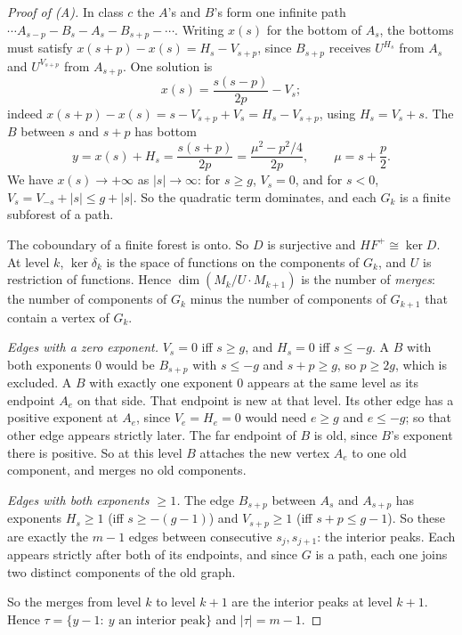 \documentclass[11pt]{article}
\theoremstyle{definition}
\newcommand{\HFp}{\mathit{HF}^+}
\begin{document}
\begin{proof}[Proof of (A)]
In class $c$ the $A$'s and $B$'s form one infinite path $\cdots A_{s-p}-B_s-A_s-B_{s+p}-\cdots$. Writing $x(s)$ for the bottom of $A_s$, the bottoms must satisfy $x(s+p)-x(s)=H_s-V_{s+p}$, since $B_{s+p}$ receives $U^{H_s}$ from $A_s$ and $U^{V_{s+p}}$ from $A_{s+p}$. One solution is
\[
x(s)=\frac{s(s-p)}{2p}-V_s;
\]
indeed $x(s+p)-x(s)=s-V_{s+p}+V_s=H_s-V_{s+p}$, using $H_s=V_s+s$. The $B$ between $s$ and $s+p$ has bottom
\[
y=x(s)+H_s=\frac{s(s+p)}{2p}=\frac{\mu^2-p^2/4}{2p},\qquad \mu=s+\frac p2.
\]
We have $x(s)\to+\infty$ as $|s|\to\infty$: for $s\ge g$, $V_s=0$, and for $s<0$, $V_s=V_{-s}+|s|\le g+|s|$. So the quadratic term dominates, and each $G_k$ is a finite subforest of a path.

The coboundary of a finite forest is onto. So $D$ is surjective and $\HFp\cong\ker D$. At level $k$, $\ker\delta_k$ is the space of functions on the components of $G_k$, and $U$ is restriction of functions. Hence $\dim(M_k/U\cdot M_{k+1})$ is the number of \emph{merges}: the number of components of $G_k$ minus the number of components of $G_{k+1}$ that contain a vertex of $G_k$.

\emph{Edges with a zero exponent.} $V_s=0$ iff $s\ge g$, and $H_s=0$ iff $s\le -g$. A $B$ with both exponents $0$ would be $B_{s+p}$ with $s\le-g$ and $s+p\ge g$, so $p\ge2g$, which is excluded. A $B$ with exactly one exponent $0$ appears at the same level as its endpoint $A_e$ on that side. That endpoint is new at that level. Its other edge has a positive exponent at $A_e$, since $V_e=H_e=0$ would need $e\ge g$ and $e\le-g$; so that other edge appears strictly later. The far endpoint of $B$ is old, since $B$'s exponent there is positive. So at this level $B$ attaches the new vertex $A_e$ to one old component, and merges no old components.

\emph{Edges with both exponents $\ge1$.} The edge $B_{s+p}$ between $A_s$ and $A_{s+p}$ has exponents $H_s\ge1$ (iff $s\ge-(g-1)$) and $V_{s+p}\ge1$ (iff $s+p\le g-1$). So these are exactly the $m-1$ edges between consecutive $s_j,s_{j+1}$: the interior peaks. Each appears strictly after both of its endpoints, and since $G$ is a path, each one joins two distinct components of the old graph.

So the merges from level $k$ to level $k+1$ are the interior peaks at level $k+1$. Hence $\tau=\{y-1:\ y\text{ an interior peak}\}$ and $|\tau|=m-1$.
\end{proof}
\end{document}
